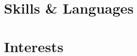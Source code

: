 \documentclass[10pt]{article}
\begin{document}
\cockpit
\befungepy
\termdo
\matsciseg
\ratiocontour
\digitalcollation

\begin{minipage}{\linewidth}
  \section{Skills \& Languages}
  \setlength{\columnsep}{-3ex}
  \begin{multicols}{5}
    \raggedcolumns
    \begin{itemize}[leftmargin=*]
      \renewcommand{\labelitemi}{}
      \renewcommand{\skill}{\textnormal}
      \setlength{\itemsep}{1pt}
      \setlength{\parskip}{0pt}
      \setlength{\parsep}{0pt}
      \skillsListLong
    \end{itemize}
  \end{multicols}
  \skillsLegend
\end{minipage}



\section{Interests}
\interests

\footerCV
\end{document}

